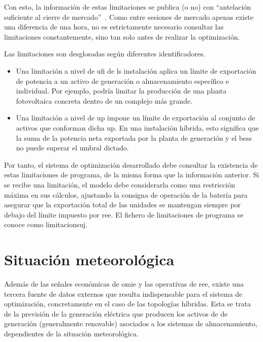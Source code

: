 Con esto, la información de estas limitaciones se publica (o no) con ``antelación suficiente al cierre de mercado''~\cite{mte2019resolucion}. Como entre sesiones de mercado apenas existe una diferencia de una hora, no es estrictamente necesario consultar las limitaciones constantemente, sino tan solo antes de realizar la optimización.

Las limitaciones son desglosadas según diferentes identificadores.

\begin{itemize}

  \item Una limitación a nivel de \gls{ufi} de ls instalación aplica un límite de exportación de potencia a un activo de generación o almacenamiento específico e individual. Por ejemplo, podría limitar la producción de una planta fotovoltaica concreta dentro de un complejo más grande.

  \item Una limitación a nivel de \gls{up} impone un límite de exportación al conjunto de activos que conforman dicha \gls{up}. En una instalación híbrida, esto significa que la suma de la potencia neta exportada por la planta de generación y el \gls{bess} no puede superar el umbral dictado.

\end{itemize}

Por tanto, el sistema de optimización desarrollado debe consultar la existencia de estas limitaciones de programa, de la misma forma que la información anterior. Si se recibe una limitación, el modelo debe considerarla como una restricción máxima en sus cálculos, ajustando la consigna de operación de la batería para asegurar que la exportación total de las unidades se mantengan siempre por debajo del límite impuesto por \gls{ree}. El fichero de limitaciones de programa se conoce como \gls{limitacionsuj}.

\section{Situación meteorológica}%
\label{makereference4.3}

Además de las señales económicas de \gls{omie} y las operativas de \gls{ree}, existe una tercera fuente de datos externos que resulta indispensable para el sistema de optimización, concretamente en el caso de las topologías híbridas. Esta se trata de la previsión de la generación eléctrica que producen los activos de de generación (generalmente renovable) asociados a los sistemas de almacenamiento, dependientes de la situación meteorológica.

